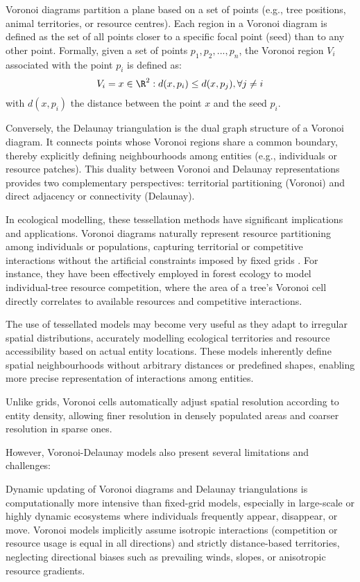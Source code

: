 Voronoi diagrams partition a plane based on a set of points (e.g., tree positions, animal territories, or resource centres). Each region in a Voronoi diagram is defined as the set of all points closer to a specific focal point (seed) than to any other point. Formally, given a set of points ${p_1, p_2, ..., p_n}$, the Voronoi region $V_i$ associated with the point $p_i$ is defined as:
\begin{align}
    V_i = { x \in \R^2 : d(x, p_i) \leq d(x, p_j), \forall j \neq i }
\end{align}
with $d(x, p_i)$ the distance between the point $x$ and the seed $p_i$.

Conversely, the Delaunay triangulation is the dual graph structure of a Voronoi diagram. It connects points whose Voronoi regions share a common boundary, thereby explicitly defining neighbourhoods among entities (e.g., individuals or resource patches). This duality between Voronoi and Delaunay representations provides two complementary perspectives: territorial partitioning (Voronoi) and direct adjacency or connectivity (Delaunay).

In ecological modelling, these tessellation methods have significant implications and applications. Voronoi diagrams naturally represent resource partitioning among individuals or populations, capturing territorial or competitive interactions without the artificial constraints imposed by fixed grids \cite{Castle2006}. For instance, they have been effectively employed in forest ecology to model individual-tree resource competition, where the area of a tree's Voronoi cell directly correlates to available resources and competitive interactions.

The use of tessellated models may become very useful as they adapt to irregular spatial distributions, accurately modelling ecological territories and resource accessibility based on actual entity locations. These models inherently define spatial neighbourhoods without arbitrary distances or predefined shapes, enabling more precise representation of interactions among entities.

Unlike grids, Voronoi cells automatically adjust spatial resolution according to entity density, allowing finer resolution in densely populated areas and coarser resolution in sparse ones.

However, Voronoi-Delaunay models also present several limitations and challenges:
\begin{Itemize}
    \Item{} Dynamic updating of Voronoi diagrams and Delaunay triangulations is computationally more intensive than fixed-grid models, especially in large-scale or highly dynamic ecosystems where individuals frequently appear, disappear, or move.
    \Item{} Voronoi models implicitly assume isotropic interactions (competition or resource usage is equal in all directions) and strictly distance-based territories, neglecting directional biases such as prevailing winds, slopes, or anisotropic resource gradients.
\end{Itemize}


